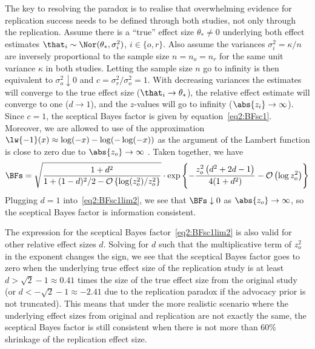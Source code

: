 The key to resolving the paradox is to realise that overwhelming evidence for
replication success needs to be defined through both studies, not only through
the replication. Assume there is a ``true'' effect size $\theta_{*} \neq 0$
underlying both effect estimates
$\that_{i} \sim \Nor(\theta_{*}, \sigma_{i}^{2})$, $i \in \{o, r\}$. Also assume
the variances $\sigma_{i}^{2} = \kappa/n$ are inversely proportional to the
sample size $n = n_{o} = n_{r}$ for the same unit variance $\kappa$ in both
studies. Letting the sample size $n$ go to infinity is then equivalent to
$\sigma_{o}^{2} \downarrow 0$ and $c = \sigma^{2}_{r}/\sigma^{2}_{o} = 1$. With
decreasing variances the estimates will
converge to the true effect size ($\that_{i} \to \theta_{*}$), the relative
effect estimate will converge to one ($d \to 1$), and the $z$-values will go to
infinity ($\abs{z_{i}} \to \infty$). Since $c = 1$, the sceptical Bayes factor
is given by equation~\eqref{eq2:BFsc1}. Moreover, we are allowed to use of the
approximation $\lw{-1}(x) \approx \log(-x) - \log(-\log(-x))$ as the argument of
the Lambert function is close to zero due to $\abs{z_{o}} \to \infty$ \citep[p.
350]{Corless1996}. Taken together, we have
\begin{align}
  \label{eq2:BFsc1lim2}
  \BFs =
  \sqrt{\frac{1 + d^{2}}{1 + (1 - d)^{2}/2 -
\mathcal{O}\left\{\log(z_{o}^{2})/z_{o}^{2}\right\}}} \cdot
  \exp\left\{-\frac{z_o^2\left(d^{2} + 2d - 1 \right)}{4(1 + d^{2})}
- \mathcal{O}\left(\log z_{o}^{2}\right)\right\}
\end{align}
Plugging $d = 1$ into~\eqref{eq2:BFsc1lim2}, we see that $\BFs \downarrow 0$ as
$\abs{z_{o}} \to \infty$, so the sceptical Bayes factor is information
consistent.

The expression for the sceptical Bayes factor~\eqref{eq2:BFsc1lim2} is also valid
for other relative effect sizes $d$. Solving for $d$ such that the
multiplicative term of $z_{o}^{2}$ in the exponent changes the sign, we see that
the sceptical Bayes factor goes to zero when the underlying true effect size of
the replication study is at least
$d > \sqrt{2} - 1 \approx 0.41$ times the size of the
true effect size from the original study (or
$d < -\sqrt{2} - 1 \approx -2.41$ due to the
replication paradox if the advocacy prior is not truncated). This means that
under the more realistic scenario where the underlying effect sizes from
original and replication are not exactly the same, the sceptical Bayes factor is
still consistent when there is not more than 60\% shrinkage of the replication
effect size.

